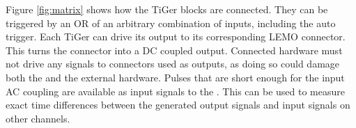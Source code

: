 Figure \ref{fig:matrix} shows how the TiGer blocks are connected. They can be triggered by an OR of an arbitrary combination of inputs, 
including the auto trigger. Each TiGer can drive its output to its corresponding LEMO connector. This turns the connector into a DC coupled output. 
Connected hardware must not drive any signals to connectors used as outputs, as doing so could damage both the \deviceName and the external hardware.
Pulses that are short enough for the input AC coupling are available as input signals to the \deviceName. 
This can be used to measure exact time differences between the generated output signals and input signals on other channels.

